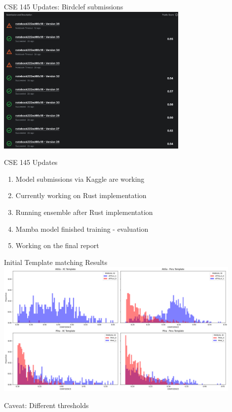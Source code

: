 \begin{frame}{CSE 145 Updates: Birdclef submissions}
    \centering
    \includegraphics[height=0.7\textheight,width=0.7\textwidth,keepaspectratio]{images/Birdclef_submissions.png}
\end{frame}

\begin{frame}{CSE 145 Updates}
    \begin{enumerate}
        \item Model submissions via Kaggle are working
        \item Currently working on Rust implementation
        \item Running ensemble after Rust implementation
        \item Mamba model finished training - evaluation
        \item Working on the final report
    \end{enumerate}
\end{frame}

\begin{frame}{Initial Template matching Results}
    \centering
    \includegraphics[height=0.9\textheight,width=0.9\textwidth,keepaspectratio]{images/conf_dists.png}

    Caveat: Different thresholds
\end{frame}

